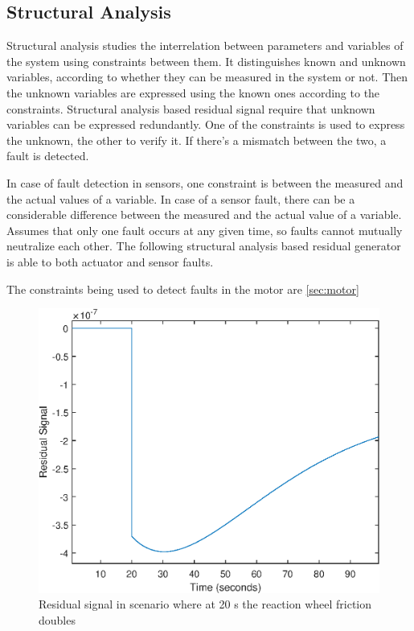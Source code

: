 \subsection{Structural Analysis}

\label{sec:structural}

Structural analysis studies the interrelation between parameters and variables of the system using constraints between them. It distinguishes known and unknown variables, according to whether they can be measured in the system or not. Then the unknown variables are expressed using the known ones according to the constraints. Structural analysis based residual signal require that unknown variables can be expressed redundantly. One of the constraints is used to express the unknown, the other to verify it. If there's a mismatch between the two, a fault is detected.

In case of fault detection in sensors, one constraint is between the measured and the actual values of a variable. In case of a sensor fault, there can be a considerable difference between the measured and the actual value of a variable. Assumes that only one fault occurs at any given time, so faults cannot mutually neutralize each other. The following structural analysis based residual generator is able to both actuator and sensor faults.

The constraints being used to detect faults in the motor are \ref{sec:motor} 

\begin{figure}
	\centering
	\includegraphics[width=120mm]{figures/residual_Noreconfig}
	\caption{Residual signal in scenario where at 20 s the reaction wheel friction doubles}
	\label{fig:rwFaultRes}
\end{figure} 

